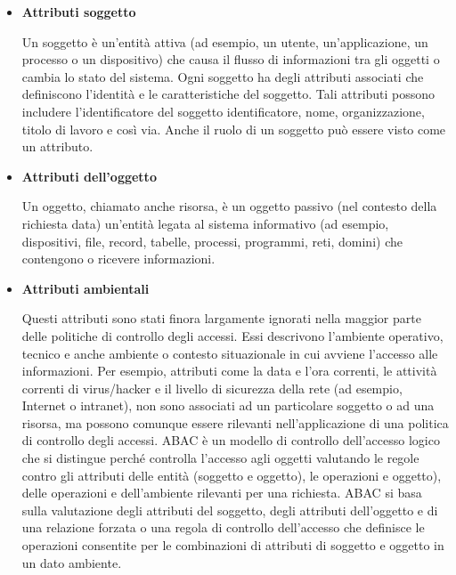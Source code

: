 \begin{itemize}
    \item \textbf{Attributi soggetto}
    
Un soggetto è un'entità attiva (ad esempio, un utente, un'applicazione, un processo o un dispositivo) che causa il flusso di informazioni tra gli oggetti o cambia lo stato del sistema. Ogni soggetto ha degli attributi associati che definiscono l'identità e le caratteristiche del soggetto. Tali attributi possono includere l'identificatore del soggetto identificatore, nome, organizzazione, titolo di lavoro e così via. Anche il ruolo di un soggetto può essere visto come un attributo.

    \item \textbf{Attributi dell'oggetto}
    
Un oggetto, chiamato anche risorsa, è un oggetto passivo (nel contesto della richiesta data) un'entità legata al sistema informativo (ad esempio, dispositivi, file, record, tabelle, processi, programmi, reti, domini) che contengono o ricevere informazioni. 

    \item \textbf{Attributi ambientali}
    
Questi attributi sono stati finora largamente ignorati nella maggior parte delle politiche di controllo degli accessi. Essi descrivono l'ambiente operativo, tecnico e anche ambiente o contesto situazionale in cui avviene l'accesso alle informazioni. Per esempio, attributi come la data e l'ora correnti, le attività correnti di virus/hacker e il livello di sicurezza della rete (ad esempio, Internet o intranet), non sono associati ad un particolare soggetto o ad una risorsa, ma possono comunque essere rilevanti nell'applicazione di una politica di controllo degli accessi. ABAC è un modello di controllo dell'accesso logico che si distingue perché controlla l'accesso agli oggetti valutando le regole contro gli attributi delle entità (soggetto e oggetto), le operazioni e oggetto), delle operazioni e dell'ambiente rilevanti per una richiesta. ABAC si basa sulla valutazione degli attributi del soggetto, degli attributi dell'oggetto e di una relazione forzata o una regola di controllo dell'accesso che definisce le operazioni consentite per le combinazioni di attributi di soggetto e oggetto in un dato ambiente.
\end{itemize}

\singlespacing

